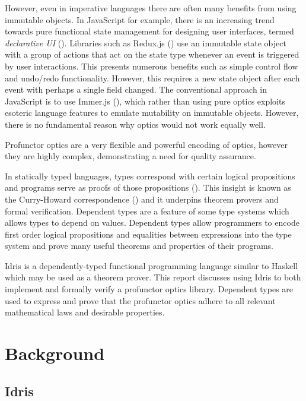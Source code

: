 \documentclass[]{report}
\begin{document}
However, even in imperative languages there are often many benefits from using immutable objects. In JavaScript for example, there is an increasing trend towards pure functional state management for designing user interfaces, termed \textit{declarative UI} (\cite{declarativeUI}). Libraries such as Redux.js (\cite{reduxjs}) use an immutable state object with a group of actions that act on the state type whenever an event is triggered by user interactions. This presents numerous benefits such as simple control flow and undo/redo functionality. However, this requires a new state object after each event with perhaps a single field changed. The conventional approach in JavaScript is to use Immer.js (\cite{immerjs}), which rather than using pure optics exploits esoteric language features to emulate mutability on immutable objects. However, there is no fundamental reason why optics would not work equally well.

Profunctor optics are a very flexible and powerful encoding of optics, however they are highly complex, demonstrating a need for quality assurance.

In statically typed languages, types correspond with certain logical propositions and programs serve as proofs of those propositions (\cite{wadler2015propositions}). This insight is known as the Curry-Howard correspondence (\cite{sorensen2006curryhoward}) and it underpins theorem provers and formal verification. Dependent types are a feature of some type systems which allows types to depend on values. Dependent types allow programmers to encode first order logical propositions and equalities between expressions into the type system and prove many useful theorems and properties of their programs.

Idris is a dependently-typed functional programming language similar to Haskell which may be used as a theorem prover. This report discusses using Idris to both implement and formally verify a profunctor optics library. Dependent types are used to express and prove that the profunctor optics adhere to all relevant mathematical laws and desirable properties.

\newpage
\section{Background}

\subsection{Idris}
\end{document}
